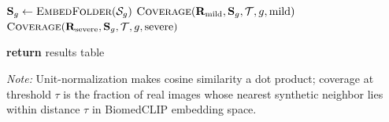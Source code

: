 \documentclass[10pt]{article}
\begin{document}
\begin{algorithm}[H]
\begin{small}
\begin{algorithmic}[1]
  \State $\mathbf{S}_g \gets \Call{EmbedFolder}{\mathcal{S}_g}$
    \State $\Call{Coverage}{\mathbf{R}_{\text{mild}}, \mathbf{S}_g, \mathcal{T}, g, \text{mild}}$
  \Else
    \State $\Call{Coverage}{\mathbf{R}_{\text{severe}}, \mathbf{S}_g, \mathcal{T}, g, \text{severe}}$
  \EndIf
\EndFor

\State \textbf{return} results table

\Statex \textit{Note:} Unit-normalization makes cosine similarity a dot product; coverage at
\Statex threshold $\tau$ is the fraction of real images whose nearest synthetic neighbor
\Statex lies within distance $\tau$ in BiomedCLIP embedding space.

\end{algorithmic}
\end{small}
\end{algorithm}
\end{document}
